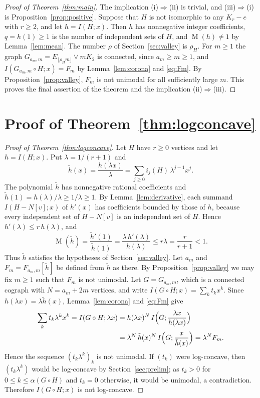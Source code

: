 \documentclass[11pt]{amsart}
\theoremstyle{remark}
\numberwithin{equation}{section}
\newcommand{\cor}{\circ}
\DeclareMathOperator{\M}{M}
\begin{document}
\begin{proof}[Proof of Theorem~\ref{thm:main}]
The implication (i)$\Rightarrow$(ii) is trivial, and (iii)$\Rightarrow$(i) is Proposition~\ref{prop:positive}. Suppose that $H$ is not isomorphic to any $K_r-e$ with $r\ge 2$, and let $h=I(H;x)$. Then $h$ has nonnegative integer coefficients, $q=h(1)\ge 1$ is the number of independent sets of $H$, and $\M(h)\ne 1$ by Lemma~\ref{lem:mean}. The number $\rho$ of Section~\ref{sec:valley} is $\rho_H$. For $m\ge 1$ the graph $G_{a_m,m}=E_{\lfloor\rho_H m\rfloor}\vee mK_2$ is connected, since $a_m\ge m\ge 1$, and $I(G_{a_m,m}\cor H;x)=F_m$ by Lemma~\ref{lem:corona} and \eqref{eq:Fm}. By Proposition~\ref{prop:valley}, $F_m$ is not unimodal for all sufficiently large $m$. This proves the final assertion of the theorem and the implication (ii)$\Rightarrow$(iii).
\end{proof}

\section{Proof of Theorem~\ref{thm:logconcave}}\label{sec:lc}

\begin{proof}[Proof of Theorem~\ref{thm:logconcave}]
Let $H$ have $r\ge 0$ vertices and let $h=I(H;x)$. Put $\lambda=1/(r+1)$ and
\[
\tilde h(x)=\frac{h(\lambda x)}{\lambda}=\sum_{j\ge 0} i_j(H)\,\lambda^{j-1}x^j .
\]
The polynomial $\tilde h$ has nonnegative rational coefficients and $\tilde h(1)=h(\lambda)/\lambda\ge 1/\lambda\ge 1$. By Lemma~\ref{lem:derivative}, each summand $I(H-N[v];x)$ of $h'(x)$ has coefficients bounded by those of $h$, because every independent set of $H-N[v]$ is an independent set of $H$. Hence $h'(\lambda)\le r\,h(\lambda)$, and
\[
\M(\tilde h)=\frac{\tilde h'(1)}{\tilde h(1)}=\frac{\lambda\,h'(\lambda)}{h(\lambda)}\le r\lambda=\frac{r}{r+1}<1 .
\]
Thus $\tilde h$ satisfies the hypotheses of Section~\ref{sec:valley}. Let $a_m$ and $F_m=F_{a_m,m}[\tilde h]$ be defined from $\tilde h$ as there. By Proposition~\ref{prop:valley} we may fix $m\ge 1$ such that $F_m$ is not unimodal. Let $G=G_{a_m,m}$, which is a connected cograph with $N=a_m+2m$ vertices, and write $I(G\cor H;x)=\sum_k t_kx^k$. Since $h(\lambda x)=\lambda\tilde h(x)$, Lemma~\ref{lem:corona} and \eqref{eq:Fm} give
\[
\begin{aligned}
\sum_k t_k\lambda^kx^k=I(G\cor H;\lambda x)&=h(\lambda x)^N\,I\Bigl(G;\frac{\lambda x}{h(\lambda x)}\Bigr)\\
&=\lambda^N\,\tilde h(x)^N\,I\Bigl(G;\frac{x}{\tilde h(x)}\Bigr)=\lambda^NF_m .
\end{aligned}
\]
Hence the sequence $(t_k\lambda^k)_k$ is not unimodal. If $(t_k)$ were log-concave, then $(t_k\lambda^k)$ would be log-concave by Section~\ref{sec:prelim}; as $t_k>0$ for $0\le k\le\alpha(G\cor H)$ and $t_k=0$ otherwise, it would be unimodal, a contradiction. Therefore $I(G\cor H;x)$ is not log-concave.
\end{proof}
\end{document}
